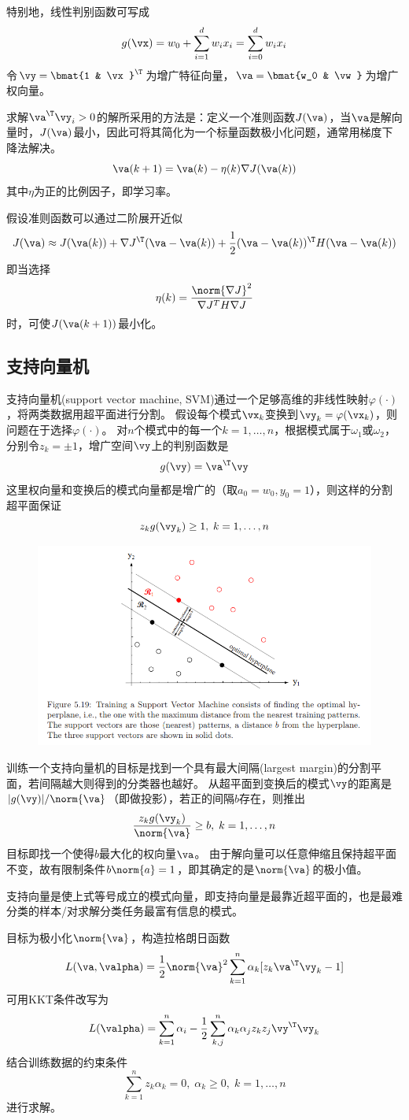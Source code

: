 特别地，线性判别函数可写成
\[g(\vx)=w_0+\sum_{i=1}^d w_i x_i=\sum_{i=0}^dw_ix_i\]
令$\vy=\bmat{1 & \vx}^\T$为增广特征向量，$\va=\bmat{w_0 & \vw}$为增广权向量。

求解$\va^\T\vy_i>0$的解所采用的方法是：定义一个准则函数$J(\va)$，当$\va$是解向量时，$J(\va)$最小，因此可将其简化为一个标量函数极小化问题，通常用梯度下降法解决。
\[\va(k+1)=\va(k)-\eta(k)\nabla J(\va(k))\]
其中$\eta$为正的比例因子，即学习率。

假设准则函数可以通过二阶展开近似
\[J(\va)\approx J(\va(k))+\nabla J^\T(\va-\va(k))+\frac{1}{2}(\va-\va(k))^\T H(\va-\va(k))\]
即当选择
\[\eta(k)=\frac{\norm{\nabla J}^2}{\nabla J^T H\nabla J}\]
时，可使$J(\va(k+1))$最小化。

\subsection{支持向量机}
支持向量机(support vector machine, SVM)通过一个足够高维的非线性映射$\varphi(\cdot)$，将两类数据用超平面进行分割。
假设每个模式$\vx_k$变换到$\vy_k=\varphi(\vx_k)$，则问题在于选择$\varphi(\cdot)$。
对$n$个模式中的每一个$k=1,\ldots,n$，根据模式属于$\omega_1$或$\omega_2$，分别令$z_k=\pm 1$，增广空间$\vy$上的判别函数是
\[g(\vy)=\va^\T\vy\]
这里权向量和变换后的模式向量都是增广的（取$a_0=w_0,y_0=1$），则这样的分割超平面保证
\[z_kg(\vy_k)\geq 1,\;k=1,\ldots,n\]
\begin{figure}[H]
\centering
\includegraphics[width=0.9\linewidth]{fig/SVM.png}
\end{figure}

训练一个支持向量机的目标是找到一个具有最大间隔(largest margin)的分割平面，若间隔越大则得到的分类器也越好。
从超平面到变换后的模式$\vy$的距离是$|g(\vy)|/\norm{\va}$（即做投影），若正的间隔$b$存在，则推出
\[\frac{z_kg(\vy_k)}{\norm{\va}}\geq b,\;k=1,\ldots,n\]
目标即找一个使得$b$最大化的权向量$\va$。
由于解向量可以任意伸缩且保持超平面不变，故有限制条件$b\norm{a}=1$，即其确定的是$\norm{\va}$的极小值。

支持向量是使上式等号成立的模式向量，即支持向量是最靠近超平面的，也是最难分类的样本/对求解分类任务最富有信息的模式。

目标为极小化$\norm{\va}$，构造拉格朗日函数
\[L(\va,\valpha)=\frac{1}{2}\norm{\va}^2\sum_{k=1}^n\alpha_k[z_k\va^\T\vy_k-1]\]
可用KKT条件改写为
\[L(\valpha)=\sum_{k=1}^n\alpha_i-\frac{1}{2}\sum_{k,j}^n\alpha_k\alpha_jz_kz_j\vy^\T\vy_k\]
结合训练数据的约束条件
\[\sum_{k=1}^nz_k\alpha_k=0,\;\alpha_k\geq 0,\;k=1,\ldots,n\]
进行求解。